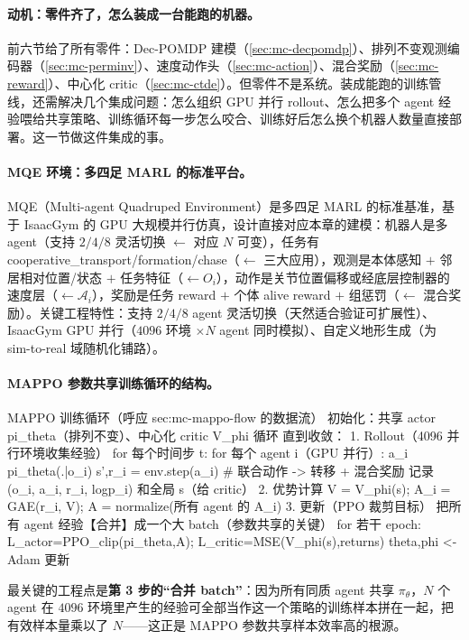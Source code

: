 \paragraph{动机：零件齐了，怎么装成一台能跑的机器。}
前六节给了所有零件：Dec-POMDP 建模（\cref{sec:mc-decpomdp}）、排列不变观测编码器（\cref{sec:mc-perminv}）、速度动作头（\cref{sec:mc-action}）、混合奖励（\cref{sec:mc-reward}）、中心化 critic（\cref{sec:mc-ctde}）。但零件不是系统。装成能跑的训练管线，还需解决几个集成问题：怎么组织 GPU 并行 rollout、怎么把多个 agent 经验喂给共享策略、训练循环每一步怎么咬合、训练好后怎么换个机器人数量直接部署。这一节做这件集成的事。

\paragraph{MQE 环境：多四足 MARL 的标准平台。}
MQE（Multi-agent Quadruped Environment）是多四足 MARL 的标准基准，基于 IsaacGym 的 GPU 大规模并行仿真\cite{xiong2024mqe}，设计直接对应本章的建模：机器人是多 agent（支持 $2/4/8$ 灵活切换 $\leftarrow$ 对应 $N$ 可变），任务有 cooperative\_transport/formation/chase（$\leftarrow$ 三大应用），观测是本体感知 $+$ 邻居相对位置/状态 $+$ 任务特征（$\leftarrow O_i$），动作是关节位置偏移或经底层控制器的速度层（$\leftarrow\mathcal{A}_i$），奖励是任务 reward $+$ 个体 alive reward $+$ 组惩罚（$\leftarrow$ 混合奖励）。关键工程特性：支持 $2/4/8$ agent 灵活切换（天然适合验证可扩展性）、IsaacGym GPU 并行（$4096$ 环境 $\times N$ agent 同时模拟）、自定义地形生成（为 sim-to-real 域随机化铺路）。

\paragraph{MAPPO 参数共享训练循环的结构。}
\begin{codebox}[text]{MAPPO 训练循环（呼应 sec:mc-mappo-flow 的数据流）}
初始化：共享 actor pi_theta（排列不变）、中心化 critic V_phi
循环 直到收敛：
  1. Rollout（4096 并行环境收集经验）
       for 每个时间步 t:  for 每个 agent i（GPU 并行）:  a_i ~ pi_theta(.|o_i)
       s',{r_i} = env.step({a_i})            # 联合动作 -> 转移 + 混合奖励
       记录 (o_i, a_i, r_i, logp_i) 和全局 s（给 critic）
  2. 优势计算
       V = V_phi(s);  A_i = GAE(r_i, V);  A = normalize(所有 agent 的 A_i)
  3. 更新（PPO 裁剪目标）
       把所有 agent 经验【合并】成一个大 batch（参数共享的关键）
       for 若干 epoch:  L_actor=PPO_clip(pi_theta,A);  L_critic=MSE(V_phi(s),returns)
                        theta,phi <- Adam 更新
\end{codebox}
\noindent 最关键的工程点是\textbf{第 3 步的“合并 batch”}：因为所有同质 agent 共享 $\pi_\theta$，$N$ 个 agent 在 $4096$ 环境里产生的经验可全部当作这一个策略的训练样本拼在一起，把有效样本量乘以了 $N$——这正是 MAPPO 参数共享样本效率高的根源。

